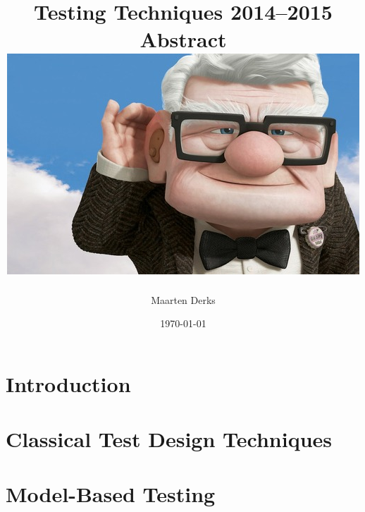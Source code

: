 \documentclass[a4paper]{report}
\title{{Testing Techniques 2014--2015}\\
	   {\large Abstract}\\
       {\includegraphics{up.jpg}}
}
\author{Maarten Derks}
\date{\today}
\begin{document}
	\maketitle

	\tableofcontents

	\chapter{Introduction}
	

	\chapter{Classical Test Design Techniques}
	

	\chapter{Model-Based Testing}
\end{document}
